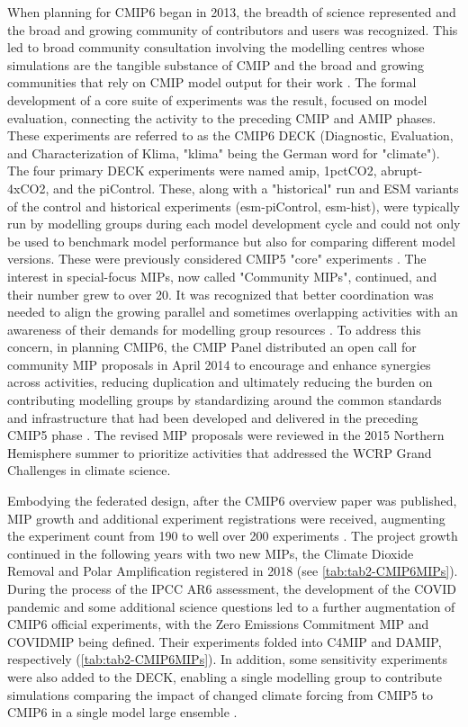 \documentclass[gmd, preprint]{copernicus}
\begin{document}
When planning for CMIP6 began in 2013, the breadth of science represented and the broad and growing community of contributors and users was recognized. This led to broad community consultation involving the modelling centres whose simulations are the tangible substance of CMIP and the broad and growing communities that rely on CMIP model output for their work \citep{eyring_overview_2016}. The formal development of a core suite of experiments was the result, focused on model evaluation, connecting the activity to the preceding CMIP and AMIP phases. These experiments are referred to as the CMIP6 DECK (Diagnostic, Evaluation, and Characterization of Klima, "klima" being the German word for "climate"). The four primary DECK experiments were named amip, 1pctCO2, abrupt-4xCO2, and the piControl. These, along with a "historical" run and ESM variants of the control and historical experiments (esm-piControl, esm-hist), were typically run by modelling groups during each model development cycle and could not only be used to benchmark model performance but also for comparing different model versions. These were previously considered CMIP5 "core" experiments \citep{stouffer_cmip5_2011}. The interest in special-focus MIPs, now called "Community MIPs", continued, and their number grew to over 20. It was recognized that better coordination was needed to align the growing parallel and sometimes overlapping activities with an awareness of their demands for modelling group resources \citep{eyring_overview_2016}. To address this concern, in planning CMIP6, the CMIP Panel distributed an open call for community MIP proposals in April 2014 to encourage and enhance synergies across activities, reducing duplication and ultimately reducing the burden on contributing modelling groups by standardizing around the common standards and infrastructure that had been developed and delivered in the preceding CMIP5 phase \citep{eyring_overview_2016}. The revised MIP proposals were reviewed in the 2015 Northern Hemisphere summer to prioritize activities that addressed the WCRP Grand Challenges in climate science.

Embodying the federated design, after the \citet{eyring_overview_2016} CMIP6 overview paper was published, MIP growth and additional experiment registrations were received, augmenting the experiment count from 190 to well over 200 experiments \citep{balaji_requirements_2018}. The project growth continued in the following years with two new MIPs, the Climate Dioxide Removal \citep[CDRMIP;][]{keller_carbon_2018} and Polar Amplification \citep[PAMIP;][]{smith_polar_2019} registered in 2018 (see \autoref{tab:tab2-CMIP6MIPs}). During the process of the IPCC AR6 assessment, the development of the COVID pandemic and some additional science questions led to a further augmentation of CMIP6 official experiments, with the Zero Emissions Commitment MIP \citep[ZECMIP;][]{jones_zero_2019} and COVIDMIP \citep{lamboll_modifying_2021} being defined. Their experiments folded into C4MIP and DAMIP, respectively (\autoref{tab:tab2-CMIP6MIPs}). In addition, some sensitivity experiments were also added to the DECK, enabling a single modelling group to contribute simulations comparing the impact of changed climate forcing from CMIP5 to CMIP6 in a single model large ensemble \citep{fyfe_significant_2021}.
\end{document}
